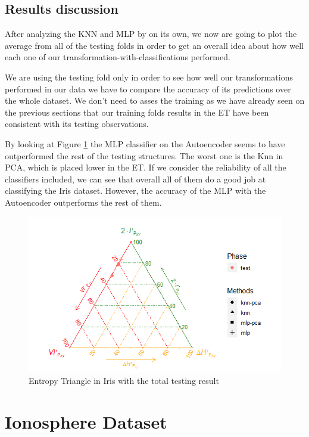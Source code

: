 \subsection{Results discussion} 

After analyzing the KNN and MLP by on its own, we now are going to plot the average from all of the testing folds in order to get an overall idea about how well each one of our transformation-with-classifications performed.               

We are using the testing fold only in order to see how well our transformations performed in our data we have to compare the accuracy of its predictions over the whole dataset. We don't need to asses the training as we have already seen on the previous sections that our training folds results in the ET have been consistent with its testing observations. \par

By looking at Figure \ref{fig:figure_ET_Total_Testing_Iris} the MLP classifier on the Autoencoder seems to have outperformed the rest of the testing structures. The worst one is the Knn in PCA, which is placed lower in the ET. If we consider the reliability of all the classifiers included, we can see that overall all of them do a good job at classifying the Iris dataset. However, the accuracy of the MLP with the Autoencoder outperforms the rest of them.
%
\begin{figure}[H]
	\includegraphics[width=1\linewidth]{Figuras_tfg/ET_Iris_Total_Results}
	\caption{Entropy Triangle in Iris with the total testing result}
	\label{fig:figure_ET_Total_Testing_Iris}
\end{figure}

\section{Ionosphere Dataset}

